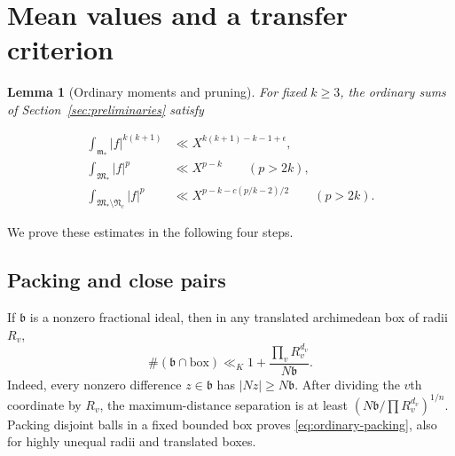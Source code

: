 \documentclass[11pt]{amsart}
\newtheorem{lemma}[theorem]{Lemma}
\theoremstyle{definition}
\numberwithin{equation}{section}
\begin{document}
\section{Mean values and a transfer criterion}
\label{sec:analytic-principles}\label{sec:ordinary-bundle}
\begin{lemma}[Ordinary moments and pruning]\label{lem:ordinary-estimates}
For fixed $k\ge3$, the ordinary sums of Section~\ref{sec:preliminaries} satisfy

\begin{align}
 \int_{\mathfrak m_*}|f|^{k(k+1)}
    &\ll X^{k(k+1)-k-1+\epsilon},\label{eq:ordinary-critical-bundle}\\
 \int_{\mathfrak M_*}|f|^p&\ll X^{p-k}\qquad(p>2k),\label{eq:ordinary-major-bundle}\\
 \int_{\mathfrak M_*\setminus\mathfrak N_c}|f|^p
    &\ll X^{p-k-c(p/k-2)/2}\qquad(p>2k).
       \label{eq:ordinary-pruning-bundle}
\end{align}
\end{lemma}
We prove these estimates in the following four steps.

\subsection{Packing and close pairs}

If $\mathfrak b$ is a nonzero fractional ideal, then in any translated
archimedean box of radii $R_v$,
\begin{equation}\label{eq:ordinary-packing}
 \#(\mathfrak b\cap\text{box})\ll_K
       1+\frac{\prod_vR_v^{d_v}}{N\mathfrak b}.
\end{equation}
Indeed, every nonzero difference $z\in\mathfrak b$ has
$|Nz|\ge N\mathfrak b$.  After dividing the $v$th coordinate by $R_v$,
the maximum-distance separation is at least
$(N\mathfrak b/\prod R_v^{d_v})^{1/n}$.
Packing disjoint balls in a fixed bounded box proves
\eqref{eq:ordinary-packing}, also for highly unequal radii and translated boxes.
\end{document}
